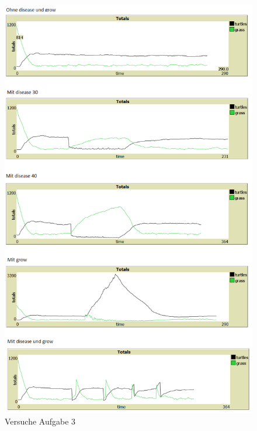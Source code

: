 \documentclass[10pt]{article}%
\theoremstyle{nonumberplain}
\begin{document}
\begin{figure}
	\centering
  \includegraphics [scale = 0.56]{Blatt 1 - 3 Bild.png}
\caption{Versuche Aufgabe 3}
\label{Abb1}
\end{figure}
\end{document}
